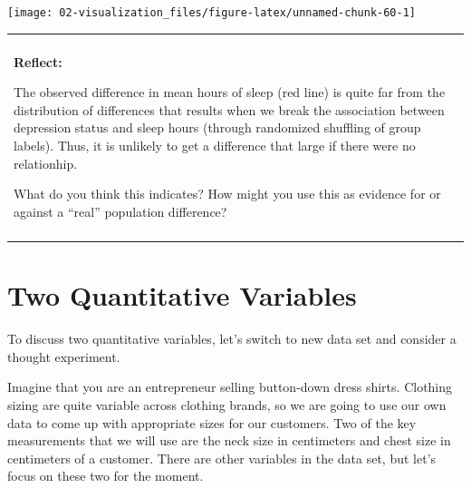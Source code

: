 \documentclass[
]{book}
\newenvironment{Shaded}{\begin{snugshade}}{\end{snugshade}}
\newcommand{\DataTypeTok}[1]{\textcolor[rgb]{0.13,0.29,0.53}{#1}}
\newcommand{\KeywordTok}[1]{\textcolor[rgb]{0.13,0.29,0.53}{\textbf{#1}}}
\newcommand{\NormalTok}[1]{#1}
\newcommand{\OperatorTok}[1]{\textcolor[rgb]{0.81,0.36,0.00}{\textbf{#1}}}
\newcommand{\StringTok}[1]{\textcolor[rgb]{0.31,0.60,0.02}{#1}}
\newenvironment{reflect}
{
    \begin{center}
    
    \begin{tabular}{|p{0.8\textwidth}|}
    \rowcolor{LightBlue}
    \hline\\
    \rowcolor{LightBlue}
    \textbf{Reflect:}
}
{
    \\\rowcolor{LightBlue}
    \\\hline
    \end{tabular} 
    \end{center}
}
\begin{document}
\begin{Shaded}
\end{Shaded}

\begin{center}\texttt{[image: 02-visualization\_files/figure-latex/unnamed-chunk-60-1]} \end{center}

\begin{reflect}
The observed difference in mean hours of sleep (red line) is quite far
from the distribution of differences that results when we break the
association between depression status and sleep hours (through
randomized shuffling of group labels). Thus, it is unlikely to get a
difference that large if there were no relationhip.

What do you think this indicates? How might you use this as evidence for
or against a ``real'' population difference?
\end{reflect}

\hypertarget{two-quantitative-variables}{%
\section{Two Quantitative Variables}\label{two-quantitative-variables}}

To discuss two quantitative variables, let's switch to new data set and consider a thought experiment.

Imagine that you are an entrepreneur selling button-down dress shirts. Clothing sizing are quite variable across clothing brands, so we are going to use our own data to come up with appropriate sizes for our customers. Two of the key measurements that we will use are the neck size in centimeters and chest size in centimeters of a customer. There are other variables in the data set, but let's focus on these two for the moment.
\end{document}
